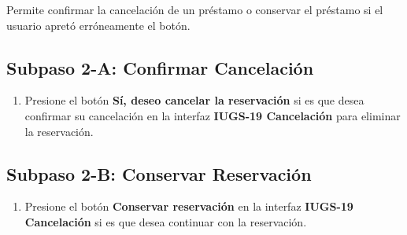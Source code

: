 Permite confirmar la cancelación de un préstamo o conservar el préstamo si el usuario apretó
erróneamente el botón.

\subsection{Subpaso 2-A: Confirmar Cancelación}
\begin{enumerate}
	\item Presione el botón \textbf{Sí, deseo cancelar la reservación} si es que desea confirmar
  su cancelación en la interfaz \textbf{IUGS-19 Cancelación} para eliminar la reservación.
\end{enumerate}

\subsection{Subpaso 2-B: Conservar Reservación}
\begin{enumerate}
	\item Presione el botón \textbf{Conservar reservación} en la interfaz
    \textbf{IUGS-19 Cancelación} si es que desea continuar con la reservación.
\end{enumerate}

